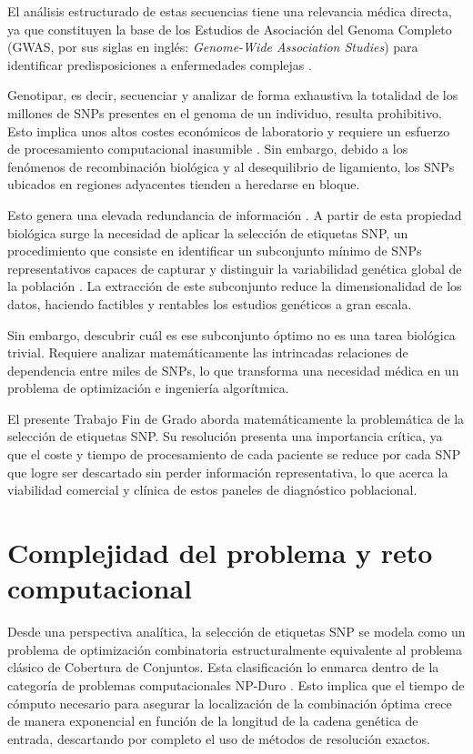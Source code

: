 El análisis estructurado de estas secuencias tiene una relevancia médica directa, ya que constituyen la base de los Estudios de Asociación del Genoma Completo (GWAS, por sus siglas en inglés: \textit{Genome-Wide Association Studies}) para identificar predisposiciones a enfermedades complejas \cite{hinds2005whole}.

Genotipar, es decir, secuenciar y analizar de forma exhaustiva la totalidad de los millones de SNPs presentes en el genoma de un individuo, resulta prohibitivo. Esto implica unos altos costes económicos de laboratorio y requiere un esfuerzo de procesamiento computacional inasumible \cite{ting2010multi}. Sin embargo, debido a los fenómenos de recombinación biológica y al desequilibrio de ligamiento, los SNPs ubicados en regiones adyacentes tienden a heredarse en bloque.

Esto genera una elevada redundancia de información \cite{bafna2003haplotypes}. A partir de esta propiedad biológica surge la necesidad de aplicar la selección de etiquetas SNP, un procedimiento que consiste en identificar un subconjunto mínimo de SNPs representativos capaces de capturar y distinguir la variabilidad genética global de la población \cite{ting2010multi, moqa2022assessing}. La extracción de este subconjunto reduce la dimensionalidad de los datos, haciendo factibles y rentables los estudios genéticos a gran escala.

Sin embargo, descubrir cuál es ese subconjunto óptimo no es una tarea biológica trivial. Requiere analizar matemáticamente las intrincadas relaciones de dependencia entre miles de SNPs, lo que transforma una necesidad médica en un problema de optimización e ingeniería algorítmica.

El presente Trabajo Fin de Grado aborda matemáticamente la problemática de la selección de etiquetas SNP. Su resolución presenta una importancia crítica, ya que el coste y tiempo de procesamiento de cada paciente se reduce por cada SNP que logre ser descartado sin perder información representativa, lo que acerca la viabilidad comercial y clínica de estos paneles de diagnóstico poblacional.

\section{Complejidad del problema y reto computacional}

Desde una perspectiva analítica, la selección de etiquetas SNP se modela como un problema de optimización combinatoria estructuralmente equivalente al problema clásico de Cobertura de Conjuntos. Esta clasificación lo enmarca dentro de la categoría de problemas computacionales NP-Duro \cite{bafna2003haplotypes}. Esto implica que el tiempo de cómputo necesario para asegurar la localización de la combinación óptima crece de manera exponencial en función de la longitud de la cadena genética de entrada, descartando por completo el uso de métodos de resolución exactos.

